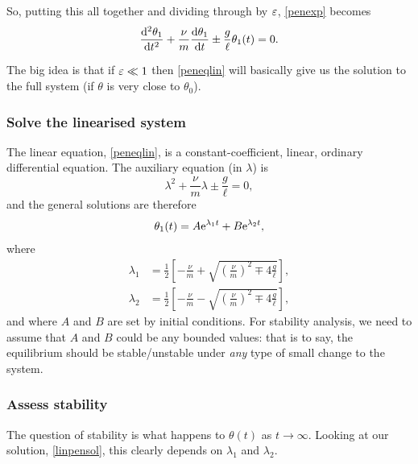 \documentclass[main.tex]{subfiles}
\begin{document}
So, putting this all together and dividing through by $\varepsilon$, \cref{penexp} becomes 
\begin{equation}
\label{peneqlin}
\fdd{\theta_1}{t} + \frac{\nu}{m} \fd{\theta_1}{t} \pm \frac{g}{\ell}\theta_1(t) =0.
\end{equation} 

The big idea is that if $\varepsilon \ll 1$ then \cref{peneqlin} will basically give us the solution to the full system (if $\theta$ is very close to $\theta_0$). 

\subsubsection*{\StepThree Solve the linearised system}
The linear equation, \cref{peneqlin}, is a constant-coefficient, linear, ordinary differential equation. The auxiliary equation (in $\lambda$) is 
\begin{equation}
\lambda^2 + \frac{\nu}{m} \lambda \pm \frac{g}{\ell} = 0,
\end{equation} 
and the general solutions are therefore
\begin{align}
\label{linpensol}\theta_1(t) = A \mathrm{e}^{\lambda_1 t} + B\mathrm{e}^{\lambda_2 t},
\end{align}
where
\begin{subequations}
\begin{align}
\lambda_1 &= \frac{1}{2}\left[-\frac{\nu}{m} +
\sqrt{\left(\frac{\nu}{m}\right)^2 \mp 4\frac{g}{\ell}} \right], \\
\lambda_2 &= \frac{1}{2}\left[-\frac{\nu}{m} -
\sqrt{\left(\frac{\nu}{m}\right)^2 \mp 4\frac{g}{\ell}} \right],
\end{align}
\end{subequations}
%
and where $A$ and $B$ are set by initial conditions. For stability analysis, we need to assume that $A$ and $B$ could be any bounded values: that is to say, the equilibrium should be stable/unstable under \emph{any} type of small change to the system.

\subsubsection*{\StepFour Assess stability}
The question of stability is what happens to $\theta(t)$ as $t \to \infty$. Looking at our solution, \cref{linpensol}, this clearly depends on $\lambda_1$ and $\lambda_2$.
\end{document}
